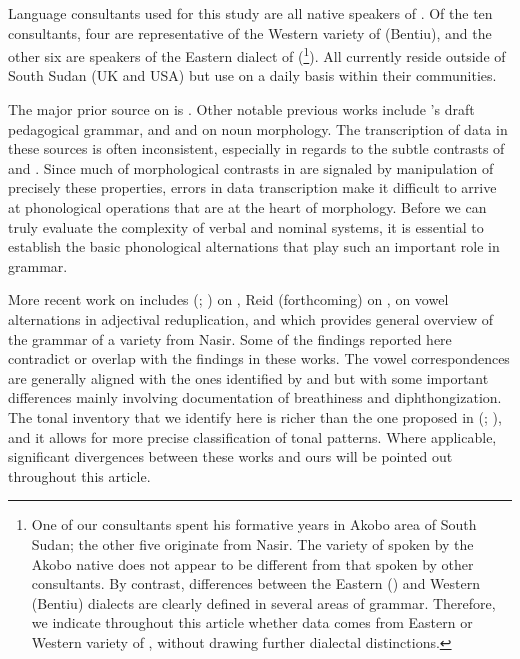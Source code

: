 \documentclass[output=paper,newtxmath,modfonts,nonflat,draftmode]{langsci/langscibook}
\begin{document}
Language consultants used for this study are all native speakers of . Of the ten consultants, four are representative of the Western variety of  (Bentiu), and the other six are speakers of the Eastern dialect of  (\footnote{One\label{fn:monich:19} of our   consultants spent his formative years in Akobo area of South Sudan; the other five originate from Nasir. The variety of  spoken by the Akobo native does not appear to be different from that spoken by other   consultants. By contrast, differences between the Eastern () and Western (Bentiu) dialects are clearly defined in several areas of grammar. Therefore, we indicate throughout this article whether data comes from Eastern or Western variety of , without drawing further dialectal distinctions.}). All currently reside outside of South Sudan (UK and USA) but use  on a daily basis within their communities. 

 
The major prior source on  is \citet{Crazzolara1933}. Other notable previous works include \citet{Vandevortnd}'s draft pedagogical grammar, and \citet{Frank1999} and \citet{Storch2005} on noun morphology. The transcription of data in these sources is often inconsistent, especially in regards to the subtle contrasts of  and . Since much of morphological contrasts in  are signaled by manipulation of precisely these properties, errors in data transcription make it difficult to arrive at phonological operations that are at the heart of  morphology. Before we can truly evaluate the complexity of  verbal and nominal systems, it is essential to establish the basic phonological alternations that play such an important role in  grammar.

More recent work on  includes
\citeauthor{gjersøe2016} (\citeyear{gjersøe2016}; \citeyear{gjersøe2017}) on , Reid (forthcoming) on , \citet{Faust2017} on vowel alternations in adjectival reduplication, and \citet{faust2015} which provides general overview of the grammar of a  variety from Nasir. Some of the findings reported here contradict or overlap with the findings in these works. The vowel correspondences are generally aligned with the ones identified by \citet{Faust2017} and \citet{faust2015} but with some important differences mainly involving documentation of breathiness and diphthongization. The tonal inventory that we identify here is richer than the one proposed in \citeauthor{gjersøe2016} (\citeyear{gjersøe2016}; \citeyear{gjersøe2017}), and it allows for more precise classification of tonal patterns. Where applicable, significant divergences between these works and ours will be pointed out throughout this article.
\end{document}
